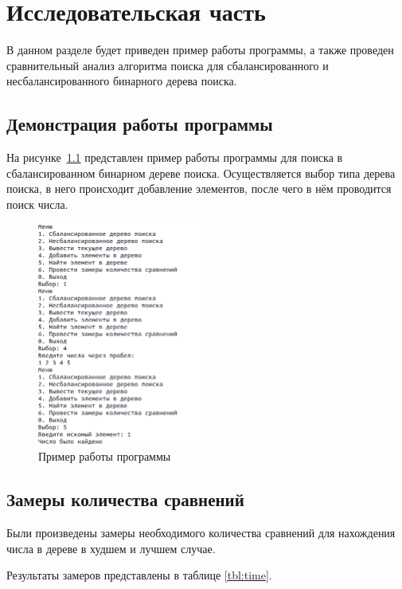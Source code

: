 \chapter{Исследовательская часть}

В данном разделе будет приведен пример работы программы, а также проведен сравнительный анализ алгоритма поиска для сбалансированного и несбалансированного бинарного дерева поиска.

\section{Демонстрация работы программы}

На рисунке~\ref{img:example}  представлен пример работы программы для поиска в сбалансированном бинарном дереве поиска.
Осуществляется выбор типа дерева поиска, в него происходит добавление элементов, после чего в нём проводится поиск числа.

\begin{figure}[h]
	\centering
	\includegraphics[width=0.5\textwidth]{img/example.png}
	\caption{Пример работы программы}
	\label{img:example}
\end{figure}

\section{Замеры количества сравнений}

Были произведены замеры необходимого количества сравнений для нахождения числа в дереве в худшем и лучшем случае.

Результаты замеров представлены в таблице \ref*{tbl:time}.

